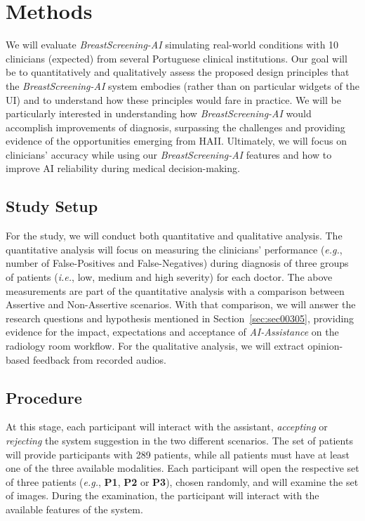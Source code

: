 \section{Methods}
\label{sec:sec004}

We will evaluate {\it BreastScreening-AI} simulating real-world conditions with 10 clinicians (expected) from several Portuguese clinical institutions.
Our goal will be to quantitatively and qualitatively assess the proposed design principles that the {\it BreastScreening-AI} system embodies (rather than on particular widgets of the UI) and to understand how these principles would fare in practice.
We will be particularly interested in understanding how {\it BreastScreening-AI} would accomplish improvements of diagnosis, surpassing the challenges and providing evidence of the opportunities emerging from HAII.
Ultimately, we will focus on clinicians' accuracy while using our {\it BreastScreening-AI} features and how to improve AI reliability during medical decision-making.

\subsection{Study Setup}
\label{sec:sec00403}

For the study, we will conduct both quantitative and qualitative analysis.
The quantitative analysis will focus on measuring the clinicians' performance ({\it e.g.}, number of False-Positives and False-Negatives) during diagnosis of three groups of patients ({\it i.e.}, low, medium and high severity) for each doctor.
The above measurements are part of the quantitative analysis with a comparison between Assertive and Non-Assertive scenarios.
With that comparison, we will answer the  research questions and hypothesis mentioned in Section~\ref{sec:sec00305}, providing evidence for the impact, expectations and acceptance of {\it AI-Assistance} on the radiology room workflow.
For the qualitative analysis, we will extract opinion-based feedback from recorded audios.

\subsection{Procedure}
\label{sec:sec00404}

At this stage, each participant will interact with the assistant, {\it accepting} or {\it rejecting} the system suggestion in the two different scenarios.
The set of patients will provide participants with 289 patients, while all patients must have at least one of the three available modalities.
Each participant will open the respective set of three patients ({\it e.g.}, {\bf P1}, {\bf P2} or {\bf P3}), chosen randomly, and will examine the set of images.
During the examination, the participant will interact with the available features of the system.

